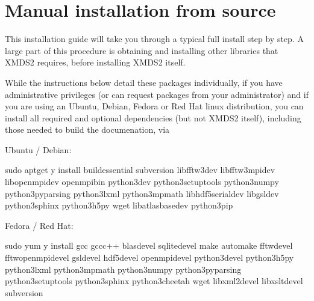 \documentclass[letterpaper,10pt,english]{sphinxmanual}
\begin{document}
\section{Manual installation from source}
\label{\detokenize{installation:manual-installation-from-source}}\label{\detokenize{installation:manualinstallation}}\label{\detokenize{installation:index-3}}
\sphinxAtStartPar
This installation guide will take you through a typical full install step by step. A large part of this procedure is obtaining and installing other libraries that XMDS2 requires, before installing XMDS2 itself.

\sphinxAtStartPar
While the instructions below detail these packages individually, if you have administrative privileges (or can request packages from your administrator) and if you are using an Ubuntu, Debian, Fedora or Red Hat linux distribution, you can install all required and optional dependencies (but not XMDS2 itself), including those needed to build the documenation, via

\sphinxAtStartPar
Ubuntu / Debian:

\begin{sphinxVerbatim}[commandchars=\\\{\}]
sudo apt\PYGZhy{}get \PYGZhy{}y install build\PYGZhy{}essential subversion libfftw3\PYGZhy{}dev libfftw3\PYGZhy{}mpi\PYGZhy{}dev libopenmpi\PYGZhy{}dev openmpi\PYGZhy{}bin python3\PYGZhy{}dev python3\PYGZhy{}setuptools python3\PYGZhy{}numpy python3\PYGZhy{}pyparsing python3\PYGZhy{}lxml python3\PYGZhy{}mpmath libhdf5\PYGZhy{}serial\PYGZhy{}dev libgsl\PYGZhy{}dev python3\PYGZhy{}sphinx python3\PYGZhy{}h5py wget libatlas\PYGZhy{}base\PYGZhy{}dev python3\PYGZhy{}pip
\end{sphinxVerbatim}

\sphinxAtStartPar
Fedora / Red Hat:

\begin{sphinxVerbatim}[commandchars=\\\{\}]
sudo yum \PYGZhy{}y install gcc gcc\PYGZhy{}c++ blas\PYGZhy{}devel sqlite\PYGZhy{}devel make automake fftw\PYGZhy{}devel fftw\PYGZhy{}openmpi\PYGZhy{}devel gsl\PYGZhy{}devel hdf5\PYGZhy{}devel openmpi\PYGZhy{}devel python3\PYGZhy{}devel python3\PYGZhy{}h5py python3\PYGZhy{}lxml python3\PYGZhy{}mpmath python3\PYGZhy{}numpy python3\PYGZhy{}pyparsing python3\PYGZhy{}setuptools python3\PYGZhy{}sphinx python3\PYGZhy{}cheetah wget libxml2\PYGZhy{}devel libxslt\PYGZhy{}devel subversion
\end{sphinxVerbatim}
\end{document}
